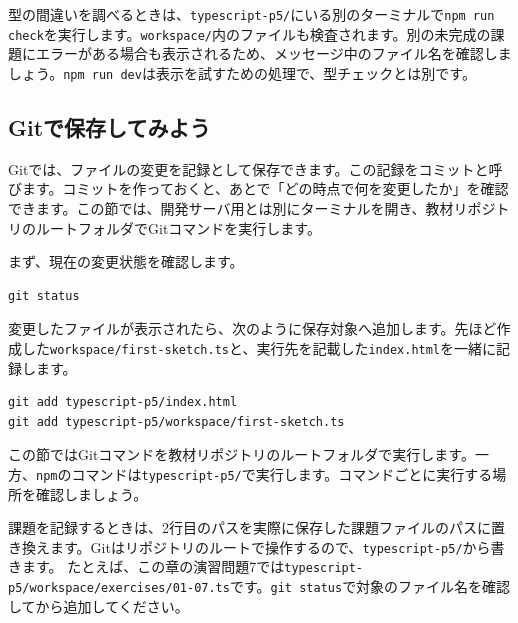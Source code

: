 型の間違いを調べるときは、\texttt{typescript-p5/}にいる別のターミナルで\texttt{npm run check}を実行します。\texttt{workspace/}内のファイルも検査されます。別の未完成の課題にエラーがある場合も表示されるため、メッセージ中のファイル名を確認しましょう。\texttt{npm run dev}は表示を試すための処理で、型チェックとは別です。

\subsection{Gitで保存してみよう}

Gitでは、ファイルの変更を記録として保存できます。この記録をコミットと呼びます。コミットを作っておくと、あとで「どの時点で何を変更したか」を確認できます。この節では、開発サーバ用とは別にターミナルを開き、教材リポジトリのルートフォルダでGitコマンドを実行します。


まず、現在の変更状態を確認します。

\begin{listing}[htbp]
\begin{verbatim}
git status
\end{verbatim}
\caption{Gitで変更状態を確認するコマンド}
\label{lst:chapter01-git-status}
\end{listing}

変更したファイルが表示されたら、次のように保存対象へ追加します。先ほど作成した\texttt{workspace/first-sketch.ts}と、実行先を記載した\texttt{index.html}を一緒に記録します。

\begin{listing}[htbp]
\begin{verbatim}
git add typescript-p5/index.html
git add typescript-p5/workspace/first-sketch.ts
\end{verbatim}
\caption{変更したファイルを保存対象へ追加するコマンド}
\label{lst:chapter01-git-add}
\end{listing}

この節ではGitコマンドを教材リポジトリのルートフォルダで実行します。一方、\texttt{npm}のコマンドは\texttt{typescript-p5/}で実行します。コマンドごとに実行する場所を確認しましょう。

課題を記録するときは、2行目のパスを実際に保存した課題ファイルのパスに置き換えます。Gitはリポジトリのルートで操作するので、\texttt{typescript-p5/}から書きます。
たとえば、この章の演習問題7では\texttt{typescript-p5/workspace/exercises/01-07.ts}です。\texttt{git status}で対象のファイル名を確認してから追加してください。

